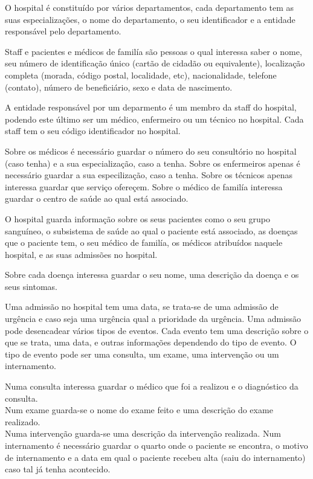 \documentclass[article, a4paper, 12pt, oneside]{memoir}
\begin{document}
O hospital é constituído por vários departamentos, cada departamento tem as suas especializações, o nome do departamento, o seu identificador e a entidade responsável pelo departamento.

Staff e pacientes e médicos de familía são pessoas o qual interessa saber o nome, seu número de identificação único (cartão de cidadão ou equivalente), localização completa (morada, código postal, localidade, etc), nacionalidade, telefone (contato), número de beneficiário, sexo e data de nascimento.

A entidade responsável por um deparmento é um membro da staff do hospital, podendo este último ser um médico, enfermeiro ou um técnico no hospital. Cada staff tem o seu código identificador no hospital.

Sobre os médicos é necessário guardar o número do seu consultório no hospital (caso tenha) e a sua especialização, caso a tenha.
Sobre os enfermeiros apenas é necessário guardar a sua especilização, caso a tenha.
Sobre os técnicos apenas interessa guardar que serviço ofereçem.
Sobre o médico de familía interessa guardar o centro de saúde ao qual está associado.

O hospital guarda informação sobre os seus pacientes como o seu grupo sanguíneo, o subsistema de saúde ao qual o paciente está associado, as doenças que o paciente tem, o seu médico de familía, os médicos atribuídos naquele hospital,  e as suas admissões no hospital.

Sobre cada doença interessa guardar o seu nome, uma descrição da doença e os seus sintomas.

Uma admissão no hospital tem uma data, se trata-se de uma admissão de urgência e caso seja uma urgência qual a prioridade da urgência. Uma admissão pode desencadear vários tipos de eventos. Cada evento tem uma descrição sobre o que se trata, uma data, e outras informações dependendo do tipo de evento. O tipo de evento pode ser uma consulta, um exame, uma intervenção ou um internamento.

Numa consulta interessa guardar o médico que foi a realizou e o diagnóstico da consulta.\\
Num exame guarda-se o nome do exame feito e uma descrição do exame realizado.\\
Numa intervenção guarda-se uma descrição da intervenção realizada.
Num internamento é necessário guardar o quarto onde o paciente se encontra, o motivo de internamento e a data em qual o paciente recebeu alta (saiu do internamento) caso tal já tenha acontecido.
\end{document}
